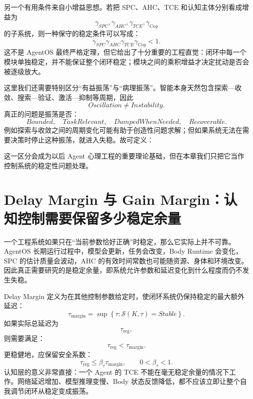 另一个有用条件来自小增益思想。若把 SPC、AHC、TCE 和认知主体分别看成增益为
\[
\gamma_{SPC},
\gamma_{AHC},
\gamma_{TCE},
\gamma_{Cog}
\]
的子系统，则一种保守的稳定条件可以写成：
\[
\gamma_{SPC}
\gamma_{AHC}
\gamma_{TCE}
\gamma_{Cog}
<1.
\]
这不是 AgentOS 最终严格定理，但它给出了十分重要的工程直觉：闭环中每一个模块单独稳定，并不能保证整个闭环稳定；模块之间的乘积增益才决定扰动是否会被逐级放大。

这里我们还需要特别区分“有益振荡”与“病理振荡”。智能本身天然包含探索—收敛、搜索—验证、激活—抑制等周期，因此
\[
Oscillation\neq Instability.
\]
真正的问题是振荡是否：
\[
Bounded,
\quad
TaskRelevant,
\quad
DampedWhenNeeded,
\quad
Recoverable.
\]
例如探索与收敛之间的周期变化可能有助于创造性问题求解；但如果系统无法在需要决策时停止这种振荡，就进入失稳。故可定义：
\begin{statementbox}
\centering
{}
\end{statementbox}
\begin{statementbox}
\centering
{}
\end{statementbox}
这一区分会成为以后 Agent 心理工程的重要理论基础，但在本章我们只把它当作控制系统的稳定性问题处理。

\section{Delay Margin 与 Gain Margin：认知控制需要保留多少稳定余量}

一个工程系统如果只在“当前参数恰好正确”时稳定，那么它实际上并不可靠。AgentOS 长期运行过程中，模型会更新，任务会改变，Body Runtime 会变化，SPC 的估计质量会波动，AHC 的有效时间常数也可能随资源、身体和环境改变。因此真正需要研究的是稳定余量，即系统允许参数和延迟变化到什么程度而仍不发生失稳。

Delay Margin 定义为在其他控制参数给定时，使闭环系统仍保持稳定的最大额外延迟：
\[
\tau_{\mathrm{margin}}
=
\sup
\left\{
\tau:
\mathcal S(K,\tau)=Stable
\right\}.
\]
如果实际总延迟为
\[
\tau_{\mathrm{reg}},
\]
则需要满足：
\[
\tau_{\mathrm{reg}}
<
\tau_{\mathrm{margin}}.
\]
更稳健地，应保留安全系数：
\[
\tau_{\mathrm{reg}}
\le
\beta_\tau
\tau_{\mathrm{margin}},
\qquad
0<\beta_\tau<1.
\]
认知层的意义非常直接：一个 Agent 的 TCE 不能在毫无稳定余量的情况下工作。网络延迟增加、模型推理变慢、Body 状态反馈降低，都不应该立即让整个自我调节闭环从稳定变成振荡。

